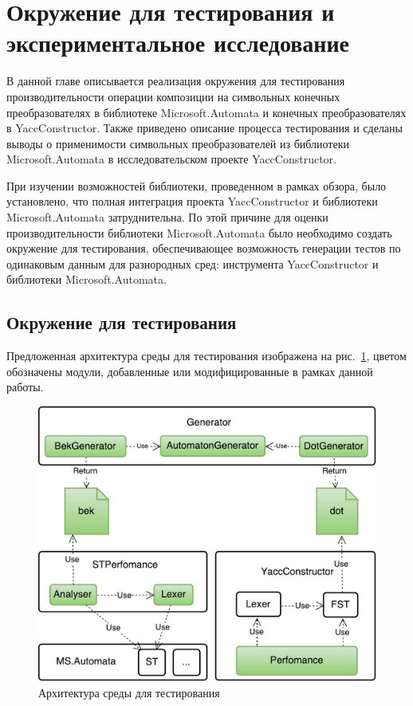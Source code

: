\documentclass[14pt]{matmex-diploma}
\begin{document}
\section{Окружение для тестирования и экспериментальное исследование}
В данной главе описывается реализация окружения для тестирования производительности операции композиции на символьных конечных преобразователях в библиотеке Microsoft.Automata и конечных преобразователях в YaccConstructor. Также приведено описание процесса тестирования и сделаны выводы о применимости символьных преобразователей из библиотеки Microsoft.Automata в исследовательском проекте YaccConstructor.

При изучении возможностей библиотеки, проведенном в рамках обзора, было установлено, что полная интеграция проекта YaccConstructor  и библиотеки Microsoft.Automata затруднительна. По этой причине для оценки производительности библиотеки Microsoft.Automata было необходимо создать окружение для тестирования, обеспечивающее возможность генерации тестов по одинаковым данным для разнородных сред: инструмента YaccConstructor и библиотеки Microsoft.Automata.

\subsection{Окружение для тестирования}
Предложенная архитектура среды для тестирования изображена на рис.~\ref{fig:toolStructure}, цветом обозначены модули, добавленные или модифицированные в рамках данной работы. 
\begin{figure}[h!]
    \begin{center}
        \includegraphics[width=\linewidth]{../pictures/YC.pdf}
        \caption{Архитектура среды для тестирования}
        \label{fig:toolStructure} 
    \end{center}
\end{figure}
\end{document}
